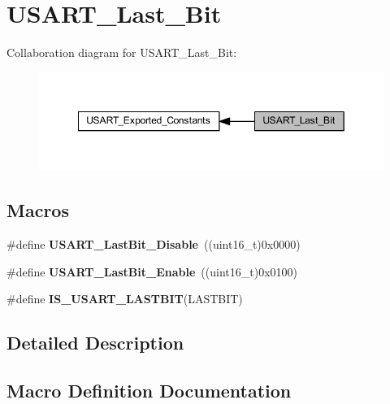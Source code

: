 \hypertarget{group___u_s_a_r_t___last___bit}{}\section{U\+S\+A\+R\+T\+\_\+\+Last\+\_\+\+Bit}
\label{group___u_s_a_r_t___last___bit}
Collaboration diagram for U\+S\+A\+R\+T\+\_\+\+Last\+\_\+\+Bit\+:
\nopagebreak
\begin{figure}[H]
\begin{center}
\leavevmode
\includegraphics[width=349pt]{group___u_s_a_r_t___last___bit}
\end{center}
\end{figure}
\subsection*{Macros}
\begin{DoxyCompactItemize}
\item 
\mbox{\label{group___u_s_a_r_t___last___bit_ga129c89b9e0dbb3ce43ee92589b3324e5}} 
\#define {\bfseries U\+S\+A\+R\+T\+\_\+\+Last\+Bit\+\_\+\+Disable}~((uint16\+\_\+t)0x0000)
\item 
\mbox{\label{group___u_s_a_r_t___last___bit_gaf8c19d1ce01c6efff8c24ee82cc7b52e}} 
\#define {\bfseries U\+S\+A\+R\+T\+\_\+\+Last\+Bit\+\_\+\+Enable}~((uint16\+\_\+t)0x0100)
\item 
\#define {\bfseries I\+S\+\_\+\+U\+S\+A\+R\+T\+\_\+\+L\+A\+S\+T\+B\+IT}(L\+A\+S\+T\+B\+IT)
\end{DoxyCompactItemize}


\subsection{Detailed Description}


\subsection{Macro Definition Documentation}
\mbox{\label{group___u_s_a_r_t___last___bit_gaa941695e5612b53e9c2aca6a9fa0d695}} 
